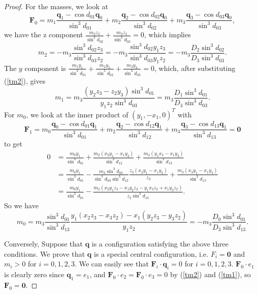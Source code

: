 \documentclass[12pt]{amsart}
\theoremstyle{definition}
\newcommand {\q} {\mathbf{q}}
\newcommand {\F} {\mathbf{F}}
\begin{document}
{\begin{proof}
For the masses, we look at $$\F_0=m_1\frac{\q_1-\cos{d_{01}}\q_0}{\sin^3{d_{01}}}+m_2\frac{\q_2-\cos{d_{02}}\q_0}{\sin^3{d_{02}}}+m_3\frac{\q_3-\cos{d_{03}}\q_0}{\sin^3{d_{03}}},$$
we have the z component $\frac{m_2z_2}{\sin^3{d_{02}}}+\frac{m_3z_3}{\sin^3{d_{03}}}=0$, which implies \begin{equation}\label{tm2}m_2=-m_3\frac{\sin^3{d_{02}}z_3}{\sin^3{d_{03}}z_2}=-m_3 \frac{\sin^3{d_{02}}y_1z_3}{\sin^3{d_{03}}y_1z_2}=-m_3\frac{D_2\sin^3{d_{02}}}{D_3\sin^3{d_{03}}}.\end{equation}
The $y$ component is $\frac{m_1y_1}{\sin^3{d_{01}}}+\frac{m_2y_2}{\sin^3{d_{02}}}+\frac{m_3y_3}{\sin^3{d_{03}}}=0$, which, after substituting (\ref{tm2}), gives \begin{equation}\label{tm1}
m_1=m_3\frac{(y_2z_3-z_2y_3)\sin^3{d_{01}}}{y_1z_2\sin^3{d_{03}}}=m_3\frac{D_1\sin^3{d_{01}}}{D_3\sin^3{d_{03}}}.\end{equation}
For $m_0$, we look at the inner product of $(y_1,-x_1, 0)^T$ with $$\F_1=m_0\frac{\q_0-\cos{d_{01}}\q_1}{\sin^3{d_{01}}}+m_2\frac{\q_2-\cos{d_{12}}\q_1}{\sin^3{d_{12}}}+m_3\frac{\q_3-\cos{d_{13}}\q_1}{\sin^3{d_{13}}}=\mathbf{0}$$
to get \begin{align*}
0&=\frac{m_0y_1}{\sin^3{d_{01}}}+\frac{m_2(x_2y_1-x_1y_2)}{\sin^3{d_{12}}}+\frac{m_3(y_1x_3-x_1y_3)}{\sin^3{d_{13}}}\\
&=\frac{m_0y_1}{\sin^3{d_{01}}}-\frac{m_3\sin^3{d_{02}}}{\sin^3{d_{03}}\sin^3{d_{12}}} \frac{z_3(x_2y_1-x_1y_2)}{z_2}+\frac{m_3(x_3y_1-x_1y_3)}{\sin^3{d_{13}}}\\
&=\frac{m_0y_1}{\sin^3{d_{01}}}-\frac{m_3(x_2y_1z_3-x_1y_2z_3-y_1x_3z_2+x_1y_3z_2)}{z_2\sin^3{d_{13}}}.\end{align*}
So we have \begin{equation}
\label{tm0}m_0=m_3\frac{\sin^3{d_{01}}}{\sin^3{d_{13}}}\frac{y_1(x_2z_3-x_3z_2)-x_1(y_2z_3-y_3z_2)}{y_1z_2}=-m_3\frac{D_0\sin^3{d_{01}}}{D_3\sin^3{d_{13}}}.\end{equation}
\medskip

Conversely, Suppose that $\q$ is a configuration satisfying the above three conditions. We prove that $\q$ is a special central configuration, i.e. $F_i=\mathbf{0}$ and $m_i>0$ for $i=0,1,2,3$. We can easily see that $\F_i \cdot \q_i=0$ for $i=0,1,2,3$. $\F_0\cdot e_1$ is clearly zero since $\q_1=e_1$, and $\F_0\cdot e_2=\F_0 \cdot e_3=0$ by (\ref{tm2}) and (\ref{tm1}), so $\F_0=\mathbf{0}$.
\smallskip


\end{proof}}
\end{document}
